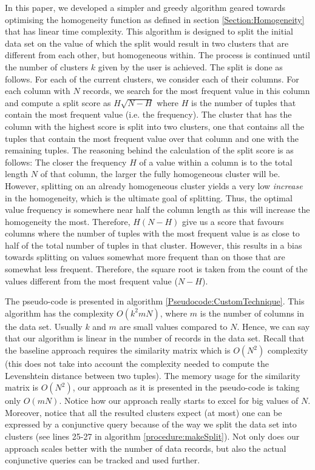 In this paper, we developed a simpler and greedy algorithm geared towards optimising the homogeneity function as defined in section \ref{Section:Homogeneity} that has linear time complexity. This algorithm is designed to split the initial data set on the value of which the split would result in two clusters that are different from each other, but homogeneous within. The process is continued until the number of clusters $k$ given by the user is achieved. 
The split is done as follows. For each of the current clusters, we consider each of their columns. For each column with $N$ records, we search for the most frequent value in this column and compute a split score as $H\sqrt{N-H}$ where $H$ is the number of tuples that contain the most frequent value (i.e. the frequency). The cluster that has the column with the highest score is split into two clusters, one that contains all the tuples that contain the most frequent value over that column and one with the remaining tuples. The reasoning behind the calculation of the split score is as follows: The closer the frequency $H$ of a value within a column is to the total length $N$ of that column, the larger the fully homogeneous cluster will be. However, splitting on an already homogeneous cluster yields a very low \textit{increase} in the homogeneity, which is the ultimate goal of splitting. Thus, the optimal value frequency is somewhere near half the column length as this will increase the homogeneity the most. Therefore, $H (N - H)$ give us a score that favours columns where the number of tuples with the most frequent value is as close to half of the total number of tuples in that cluster. However, this results in a bias towards splitting on values somewhat more frequent than on those that are somewhat less frequent. Therefore, the square root is taken from the count of the values different from the most frequent value ($N-H$).

The pseudo-code is presented in algorithm \ref{Pseudocode:CustomTechnique}. This algorithm has the complexity $O(k^2m N)$, where $m$ is the number of columns in the data set. Usually $k$ and $m$ are small values compared to $N$. Hence, we can say that our algorithm is linear in the number of records in the data set. Recall that the baseline approach requires the similarity matrix which is $O(N^2)$ complexity (this does not take into account the complexity needed to compute the Levenshtein distance between two tuples). The memory usage for the similarity matrix is $O(N^2)$, our approach as it is presented in the pseudo-code is taking only $O(mN)$. Notice how our approach really starts to excel for big values of $N$. Moreover, notice that all the resulted clusters expect (at most) one can be expressed by a conjunctive query because of the way we split the data set into clusters (see lines 25-27 in algorithm \ref{procedure:makeSplit}). Not only does our approach scales better with the number of data records, but also the actual conjunctive queries can be tracked and used further.

